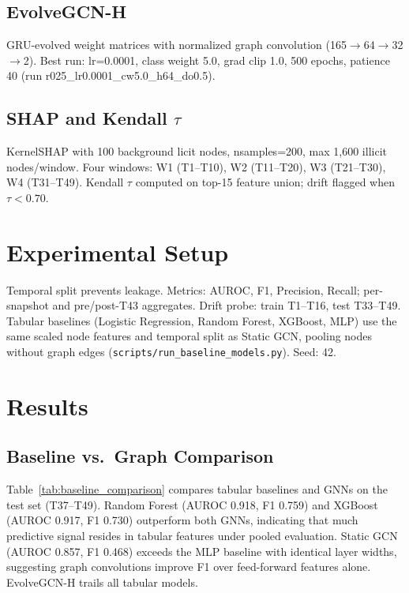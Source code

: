 \documentclass[conference]{IEEEtran}
\begin{document}
\subsection{EvolveGCN-H}
GRU-evolved weight matrices with normalized graph convolution (165$\rightarrow$64$\rightarrow$32$\rightarrow$2). Best run: lr=0.0001, class weight 5.0, grad clip 1.0, 500 epochs, patience 40 (run r025\_lr0.0001\_cw5.0\_h64\_do0.5).

\subsection{SHAP and Kendall $\tau$}
KernelSHAP with 100 background licit nodes, nsamples=200, max 1,600 illicit nodes/window. Four windows: W1 (T1--T10), W2 (T11--T20), W3 (T21--T30), W4 (T31--T49). Kendall $\tau$ computed on top-15 feature union; drift flagged when $\tau < 0.70$.

\section{Experimental Setup}
Temporal split prevents leakage. Metrics: AUROC, F1, Precision, Recall; per-snapshot and pre/post-T43 aggregates. Drift probe: train T1--T16, test T33--T49. Tabular baselines (Logistic Regression, Random Forest, XGBoost, MLP) use the same scaled node features and temporal split as Static GCN, pooling nodes without graph edges (\texttt{scripts/run\_baseline\_models.py}). Seed: 42.

\section{Results}

\subsection{Baseline vs.\ Graph Comparison}
Table~\ref{tab:baseline_comparison} compares tabular baselines and GNNs on the test set (T37--T49). Random Forest (AUROC 0.918, F1 0.759) and XGBoost (AUROC 0.917, F1 0.730) outperform both GNNs, indicating that much predictive signal resides in tabular features under pooled evaluation. Static GCN (AUROC 0.857, F1 0.468) exceeds the MLP baseline with identical layer widths, suggesting graph convolutions improve F1 over feed-forward features alone. EvolveGCN-H trails all tabular models.


\end{document}
